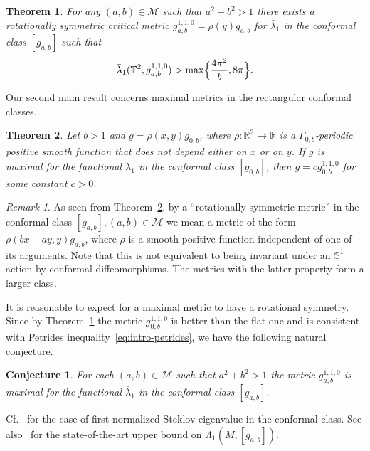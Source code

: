 \documentclass{amsart}
\theoremstyle{plain}
\newtheorem{conjecture}{Conjecture}[section]
\newtheorem{theorem}{Theorem}
\theoremstyle{definition}
\theoremstyle{remark}
\newtheorem{remark}{Remark}[section]
\begin{document}
\begin{theorem}\label{th:intro-flatnotmax}
For any \((a,b)\in\mathcal M\) such that \(a^2+b^2>1\) there exists a
rotationally symmetric critical metric \(g_{a,b}^{1,1,0}=\rho(y)g_{a,b}\) for
\(\bar\lambda_1\) in the conformal class \([g_{a,b}]\) such that
\[
\bar\lambda_1(\mathbb T^2,g_{a,b}^{1,1,0})>
\max\Bigl\{\frac{4\pi^2}b,8\pi\Bigr\}.
\]
\end{theorem}

Our second main result concerns maximal metrics in the rectangular conformal
classes.

\begin{theorem}\label{th:intro-rectmax}
Let \(b>1\) and \(g=\rho(x,y)g_{0,b}\), where \(\rho\colon\mathbb R^2\to\mathbb
R\) is a \(\Gamma_{0,b}\)-periodic positive smooth function that does not depend
either on \(x\) or on \(y\). If \(g\) is maximal for the functional
\(\bar\lambda_1\) in the conformal class \([g_{0,b}]\), then
\(g=cg_{0,b}^{1,1,0}\) for some constant \(c>0\).
\end{theorem}

\begin{remark}
As seen from Theorem~\ref{th:intro-rectmax}, by a ``rotationally symmetric
metric'' in the conformal class \([g_{a,b}],(a,b)\in\mathcal M\) we mean a
metric of the form \(\rho(bx-ay,y)g_{a,b}\), where \(\rho\) is a smooth positive
function independent of one of its arguments. Note that this is not equivalent
to being invariant under an \(\mathbb S^1\) action by conformal diffeomorphisms.
The metrics with the latter property form a larger class.
\end{remark}

It is reasonable to expect for a maximal metric to have a rotational symmetry.
Since by Theorem~\ref{th:intro-flatnotmax} the metric \(g_{0,b}^{1,1,0}\) is
better than the flat one and is consistent with Petrides
inequality~\eqref{eq:intro-petrides}, we have the following natural conjecture.

\begin{conjecture}\label{con:intro-maxmetric}
For each \((a,b)\in\mathcal M\) such that \(a^2+b^2>1\) the metric
\(g_{a,b}^{1,1,0}\) is maximal for the functional \(\bar\lambda_1\) in the
conformal class \([g_{a,b}]\).
\end{conjecture}

Cf.~\cite[Conjecture~1]{KM2022} for the case of first normalized Steklov
eigenvalue in the conformal class. See also~\cite{Kang2025} for the
state-of-the-art upper bound on \(\Lambda_1(M,[g_{a,b}])\).
\end{document}
